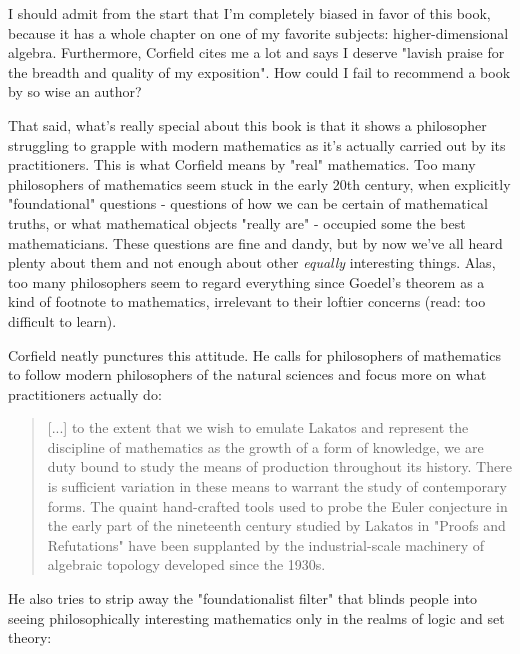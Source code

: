 I should admit from the start that I'm completely biased
in favor of this book, because it has a whole chapter 
on one of my favorite subjects: higher-dimensional algebra.
Furthermore, Corfield cites me a lot and says I deserve 
"lavish praise for the breadth and quality of my exposition".  
How could I fail to recommend a book by so wise an author? 

That said, what's really special about this book is that it 
shows a philosopher struggling to grapple with modern mathematics 
as it's actually carried out by its practitioners.  This is what
Corfield means by "real" mathematics.  Too many philosophers of
mathematics seem stuck in the early 20th century, when explicitly 
"foundational" questions - questions of how we can be certain of 
mathematical truths, or what mathematical objects "really are" - 
occupied some the best mathematicians.  These questions are fine 
and dandy, but by now we've all heard plenty about them and not 
enough about other \emph{equally} interesting things.  Alas, too many 
philosophers seem to regard everything since Goedel's theorem as 
a kind of footnote to mathematics, irrelevant to their loftier
concerns (read: too difficult to learn).

Corfield neatly punctures this attitude.  He calls for philosophers 
of mathematics to follow modern philosophers of the natural sciences
and focus more on what practitioners actually do:

\begin{quote}
     [...] to the extent that we wish to emulate Lakatos and 
     represent the discipline of mathematics as the growth of 
     a form of knowledge, we are duty bound to study the means 
     of production throughout its history.  There is sufficient
     variation in these means to warrant the study of contemporary
     forms.  The quaint hand-crafted tools used to probe the 
     Euler conjecture in the early part of the nineteenth century 
     studied by Lakatos in "Proofs and Refutations" have been 
     supplanted by the industrial-scale machinery of algebraic 
     topology developed since the 1930s.  

\end{quote}
He also tries to strip away the "foundationalist filter" that 
blinds people into seeing philosophically interesting mathematics
only in the realms of logic and set theory:

